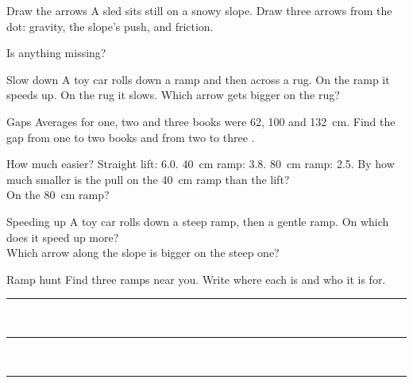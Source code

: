 \begin{puzzle}{Draw the arrows}
A sled sits still on a snowy slope. Draw three arrows from the dot: gravity, the slope's push, and friction.
\begin{center}
\end{center}
Is anything missing? \wline[3cm]
\end{puzzle}

\begin{puzzle}{Slow down}
A toy car rolls down a ramp and then across a rug. On the ramp it speeds up. On the rug it slows. Which arrow gets bigger on the rug? \wline[2.5cm]
\end{puzzle}
\clearpage

\begin{puzzle}{Gaps}
Averages for one, two and three books were 62, 100 and 132~cm. Find the gap from one to two books \wline[1.6cm] and from two to three \wline[1.6cm].
\end{puzzle}

\begin{puzzle}{How much easier?}
Straight lift: 6.0. 40~cm ramp: 3.8. 80~cm ramp: 2.5. By how much smaller is the pull on the 40~cm ramp than the lift? \wline[1.6cm]\\
On the 80~cm ramp? \wline[1.6cm]
\end{puzzle}

\begin{puzzle}{Speeding up}
A toy car rolls down a steep ramp, then a gentle ramp. On which does it speed up more? \wline[3cm]\\
Which arrow along the slope is bigger on the steep one? \wline[3cm]
\end{puzzle}

\begin{puzzle}{Ramp hunt}
Find three ramps near you. Write where each is and who it is for.\\
\rule{\linewidth}{0.5pt}\\[10pt]\rule{\linewidth}{0.5pt}\\[10pt]\rule{\linewidth}{0.5pt}
\end{puzzle}
\clearpage
